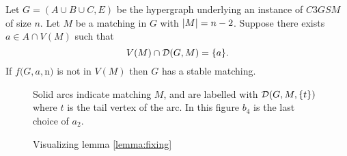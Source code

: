 \begin{lemma}\label{lemma:fixing}
Let $G = (A\cup B \cup C, E)$ be the hypergraph underlying an instance of $C3GSM$ of size $n$. Let $M$ be a matching in $G$ with $\left|M\right| = n-2$. Suppose there exists $a \in A \cap V(M)$ such that $$V(M) \cap \mathcal{D}(G,M) = \{a\}.$$ If $f(G, a, $n$)$ is not in $V(M)$ then $G$ has a stable matching.
\end{lemma}
\begin{figure}[h]
\centering
{}
\caption{Visualizing lemma \ref{lemma:fixing}}
\small
\begin{flushleft}
Solid arcs indicate matching $M$, and are labelled with $\mathcal{D}(G,M,\{t\})$ where $t$ is the tail vertex of the arc. In this figure $b_4$ is the last choice of $a_2$.
\end{flushleft}
\end{figure}
